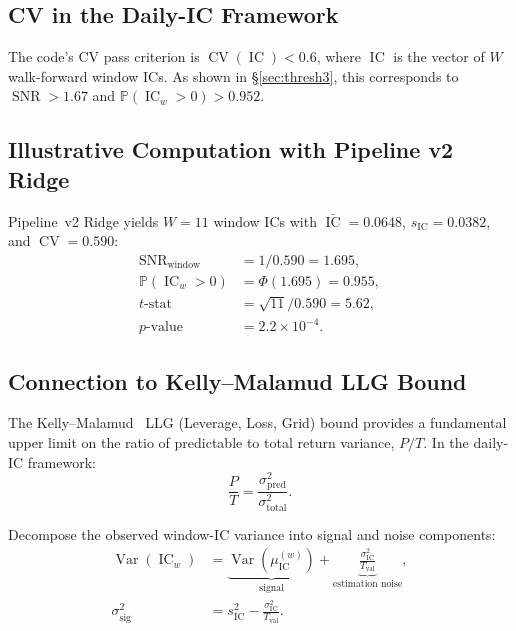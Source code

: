 \documentclass[11pt,a4paper]{article}
\theoremstyle{definition}
\newcommand{\IC}{\operatorname{IC}}
\newcommand{\Var}{\operatorname{Var}}
\newcommand{\CV}{\operatorname{CV}}
\newcommand{\Prob}{\mathbb{P}}
\newcommand{\SNR}{\operatorname{SNR}}
\begin{document}
\subsection{CV in the Daily-IC Framework}

The code's CV pass criterion is $\CV(\IC) < 0.6$, where $\IC$ is the
vector of $W$ walk-forward window ICs. As shown in \S\ref{sec:thresh3},
this corresponds to $\SNR > 1.67$ and $\Prob(\IC_{w}>0) > 0.952$.

\subsection{Illustrative Computation with Pipeline v2 Ridge}

Pipeline~v2 Ridge yields $W=11$ window ICs with $\bar{\IC}=0.0648$,
$s_{\IC}=0.0382$, and $\CV=0.590$:
\begin{align}
    \SNR_{\text{window}} &= 1/0.590 = 1.695, \\
    \Prob(\IC_{w} > 0)  &= \Phi(1.695) = 0.955, \\
    t\text{-stat}       &= \sqrt{11}/0.590 = 5.62, \\
    p\text{-value}      &= 2.2 \times 10^{-4}.
\end{align}

\subsection{Connection to Kelly--Malamud LLG Bound}

The Kelly--Malamud~\cite{kelly2013} LLG (Leverage, Loss, Grid) bound
provides a fundamental upper limit on the ratio of predictable to total
return variance, $P/T$. In the daily-IC framework:
\begin{equation}
    \frac{P}{T} = \frac{\sigma_{\text{pred}}^{2}}
                       {\sigma_{\text{total}}^{2}}.
\end{equation}

Decompose the observed window-IC variance into signal and noise
components:
\begin{align}
    \Var(\IC_{w}) &= \underbrace{\Var(\mu_{\IC}^{(w)})}_{\text{signal}}
                   + \underbrace{\frac{\sigma_{\IC}^{2}}{T_{\text{val}}}}
                                  _{\text{estimation noise}}, \\[4pt]
    \sigma_{\text{sig}}^{2} &= s_{\IC}^{2}
                             - \frac{\sigma_{\IC}^{2}}{T_{\text{val}}}.
\end{align}
\end{document}
